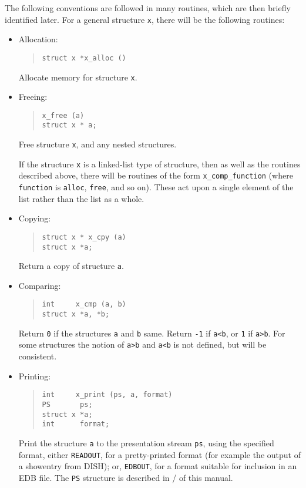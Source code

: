 The following conventions are followed in many routines, which are then
briefly identified later.
For a general structure \verb"x", there will be the following routines:
\begin{itemize}
\item Allocation:
\begin{quote}\small\begin{verbatim}
struct x *x_alloc ()
\end{verbatim}\end{quote}
Allocate memory for structure \verb"x".

\item Freeing:
\begin{quote}\small\begin{verbatim}
x_free (a)
struct x * a;
\end{verbatim}\end{quote}
Free structure \verb"x", and any nested structures.

If the structure \verb"x" is a linked-list type of structure, then as well
as the routines described above, there will be routines of the
form 
\verb"x_comp_function" (where \verb"function" is \verb"alloc",
\verb"free", and so on).  These act upon a single element of the
list rather than the list as a whole.

\item Copying:
\begin{quote}\small\begin{verbatim}
struct x * x_cpy (a)
struct x *a;
\end{verbatim}\end{quote}
Return a copy of structure \verb"a".

\item Comparing:
\begin{quote}\small\begin{verbatim}
int     x_cmp (a, b)
struct x *a, *b;
\end{verbatim}\end{quote}
Return \verb"0" if the structures \verb"a" and \verb"b" same.  Return
\verb"-1" if \verb"a<b", or \verb"1" if \verb"a>b".
For some structures the notion of \verb"a>b" and \verb"a<b" is not defined,
but will be consistent.

\item Printing:
\begin{quote}
\small\begin{verbatim}
int     x_print (ps, a, format)
PS       ps;
struct x *a;
int      format;
\end{verbatim}\end{quote}
Print the structure \verb"a" to the presentation stream \verb"ps", using the
specified format, either \verb"READOUT", for a pretty-printed format (for
example the output of a showentry from DISH); or,
\verb"EDBOUT", for a format suitable for inclusion in an EDB file.
The \verb"PS" structure is described in \volone/ of this manual.


\end{itemize}
